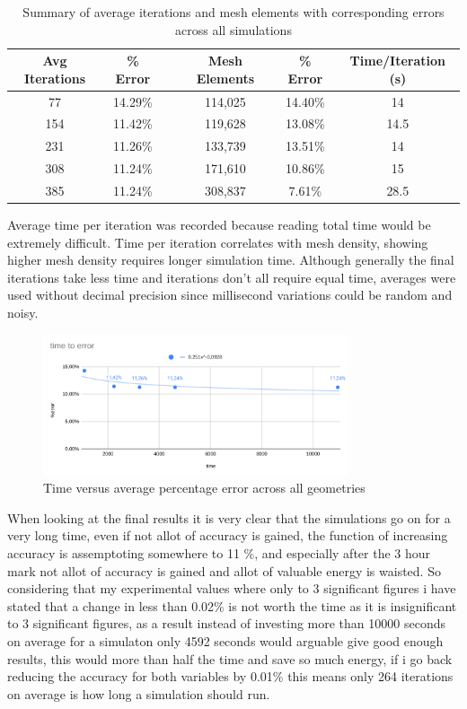 \documentclass[12pt,a4paper]{article}
\begin{document}
\begin{table}[H]
\centering
\caption{Summary of average iterations and mesh elements with corresponding errors across all simulations}
\label{tab:overall_summary}
\begin{tabular}{|c|c|c|c|c|c|}
\hline
\rowcolor{lightblue}
\textbf{Avg Iterations} & \textbf{\% Error} & & \textbf{Mesh Elements} & \textbf{\% Error} & \textbf{Time/Iteration (s)} \\
\hline
77 & 14.29\% & & 114,025 & 14.40\% & 14 \\
\hline
154 & 11.42\% & & 119,628 & 13.08\% & 14.5 \\
\hline
231 & 11.26\% & & 133,739 & 13.51\% & 14 \\
\hline
308 & 11.24\% & & 171,610 & 10.86\% & 15 \\
\hline
385 & 11.24\% & & 308,837 & 7.61\% & 28.5 \\
\hline
\end{tabular}
\end{table}

Average time per iteration was recorded because reading total time would be extremely difficult. Time per iteration correlates with mesh density, showing higher mesh density requires longer simulation time. Although generally the final iterations take less time and iterations don't all require equal time, averages were used without decimal precision since millisecond variations could be random and noisy.

\begin{figure}[H]
    \centering
    \includegraphics[width=0.8\textwidth]{image6.png}
    \caption{Time versus average percentage error across all geometries}
    \label{fig:time_vs_error}
\end{figure}

When looking at the final results it is very clear that the simulations go on for a very long time, even if not allot of accuracy is gained, the function of increasing accuracy is assemptoting somewhere to 11 \%, and especially after the 3 hour mark not allot of accuracy is gained and allot of valuable energy is waisted. So considering that my experimental values where only to 3 significant figures i have stated that a change in less than 0.02\% is not worth the time as it is insignificant to 3 significant figures, as a result instead of investing more than 10000 seconds on average for a simulaton only 4592 seconds would arguable give good enough results, this would more than half the time and save so much energy, if i go back reducing the accuracy for both variables by 0.01\% this means only 264 iterations on average is how long a simulation should run.
\end{document}
